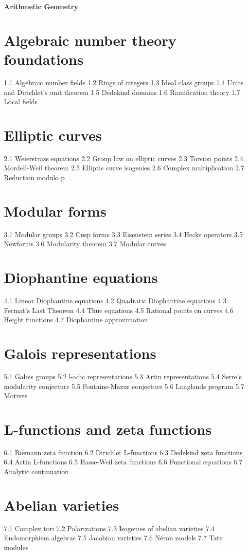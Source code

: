 ﻿{\LARGE \bf{Arithmetic Geometry}}

\section{Algebraic number theory foundations}
1.1 Algebraic number fields
1.2 Rings of integers
1.3 Ideal class groups
1.4 Units and Dirichlet's unit theorem
1.5 Dedekind domains
1.6 Ramification theory
1.7 Local fields
\section{Elliptic curves}
2.1 Weierstrass equations
2.2 Group law on elliptic curves
2.3 Torsion points
2.4 Mordell-Weil theorem
2.5 Elliptic curve isogenies
2.6 Complex multiplication
2.7 Reduction modulo p
\section{Modular forms}
3.1 Modular groups
3.2 Cusp forms
3.3 Eisenstein series
3.4 Hecke operators
3.5 Newforms
3.6 Modularity theorem
3.7 Modular curves
\section{Diophantine equations}
4.1 Linear Diophantine equations
4.2 Quadratic Diophantine equations
4.3 Fermat's Last Theorem
4.4 Thue equations
4.5 Rational points on curves
4.6 Height functions
4.7 Diophantine approximation
\section{Galois representations}
5.1 Galois groups
5.2 l-adic representations
5.3 Artin representations
5.4 Serre's modularity conjecture
5.5 Fontaine-Mazur conjecture
5.6 Langlands program
5.7 Motives
\section{L-functions and zeta functions}
6.1 Riemann zeta function
6.2 Dirichlet L-functions
6.3 Dedekind zeta functions
6.4 Artin L-functions
6.5 Hasse-Weil zeta functions
6.6 Functional equations
6.7 Analytic continuation
\section{Abelian varieties}
7.1 Complex tori
7.2 Polarizations
7.3 Isogenies of abelian varieties
7.4 Endomorphism algebras
7.5 Jacobian varieties
7.6 Néron models
7.7 Tate modules
